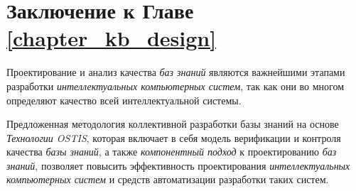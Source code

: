 \section*{Заключение к Главе \ref{chapter_kb_design}}
\label{kb_design_conclusion}

Проектирование и анализ качества \textit{баз знаний} являются важнейшими этапами разработки \textit{интеллектуальных компьютерных систем}, так как они во многом определяют качество всей интеллектуальной системы.

Предложенная методология коллективной разработки базы знаний на основе \textit{Технологии OSTIS}, которая включает в себя модель верификации и контроля качества \textit{базы знаний}, а также \textit{компонентный подход} к проектированию \textit{баз знаний}, позволяет повысить эффективность проектирования \textit{интеллектуальных компьютерных систем} и средств автоматизации разработки таких систем.
%